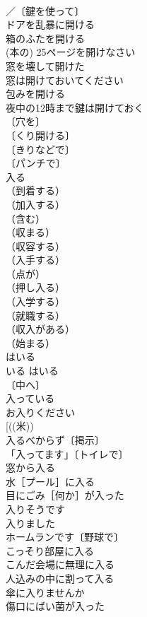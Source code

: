 \documentclass[8pt]{extreport}
\begin{document}
\begin{CJK}{UTF8}{min}
\\	／〔鍵を使って〕
\\	ドアを乱暴に開ける 
\\	箱のふたを開ける 
\\	(本の) 25ページを開けなさい 
\\	窓を壊して開けた 
\\	窓は開けておいてください 
\\	包みを開ける 
\\	夜中の12時まで鍵は開けておく 
\\	〔穴を〕
\\	〔くり開ける〕
\\	〔きりなどで〕
\\	〔パンチで〕
\\	入る	
\\	（到着する）
\\	（加入する）
\\	（含む）
\\	（収まる）
\\	（収容する）
\\	（入手する）
\\	（点が）
\\	（押し入る）
\\	（入学する）
\\	（就職する）
\\	（収入がある）
\\	（始まる）
\\	はいる 
\\	いる はいる 
\\	〔中へ〕
\\	入っている 
\\	お入りください 
\\	[((米))
\\	入るべからず〔掲示〕 
\\	「入ってます」〔トイレで〕 
\\	窓から入る 
\\	水［プール］に入る 
\\	目にごみ［何か］が入った 
\\	入りそうです
\\	入りました
\\	ホームランです〔野球で〕 
\\	こっそり部屋に入る 
\\	こんだ会場に無理に入る 
\\	人込みの中に割って入る 
\\	傘に入りませんか 
\\	傷口にばい菌が入った 

\end{CJK}
\end{document}
